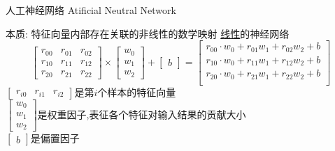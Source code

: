 \documentclass{beamer}
\begin{document}
\begin{frame} {人工神经网络 Atificial Neutral Network} 

\begin{block}{本质: \mbox{\color{yellow}特征向量内部存在关联}的\mbox{\color{red}非线性}的数学映射}
    \mbox{\underline{线性}的神经网络}
    $${
    \begin{bmatrix}
    r_{00}&r_{01}&r_{02}\\
    r_{10}&r_{11}&r_{12}\\
    r_{20}&r_{21}&r_{22}
    \end{bmatrix} \times
    \begin{bmatrix}
    w_0\\w_1\\w_2
    \end{bmatrix} +
    \begin{bmatrix}
    b
    \end{bmatrix} =
    \begin{bmatrix}
    r_{00} \cdot w_0+r_{01}w_1+r_{02}w_2+b \\
    r_{10} \cdot w_0+r_{11}w_1+r_{12}w_2+b \\
    r_{20} \cdot w_0+r_{21}w_1+r_{22}w_2+b \\
    \end{bmatrix}
    \
    }$$
    $\begin{bmatrix}r_{i0}&r_{i1}&r_{i2}\end{bmatrix}$是第$i$个样本的特征向量 \\
    $\begin{bmatrix}w_0\\w_1\\w_2\end{bmatrix}$是权重因子,表征各个特征对输入结果的贡献大小 \\
    $\begin{bmatrix}b\end{bmatrix}$是偏置因子 
    \begin{center}
    \end{center}
\end{block}

\end{frame}
\end{document}
